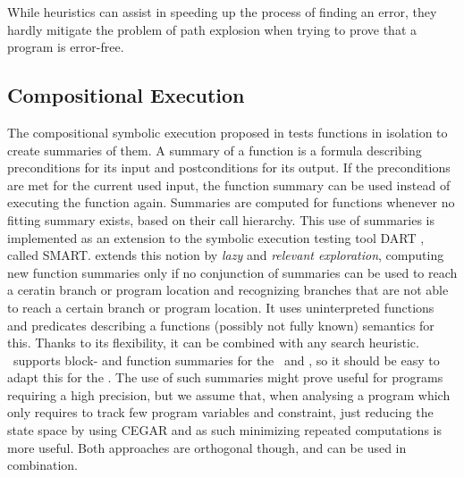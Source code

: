 While heuristics can assist in speeding up the process of finding an error, they hardly mitigate the problem of path explosion when trying to prove that a program is error-free.
\subsection*{Compositional Execution}
The compositional symbolic execution proposed in \cite{Godefroid2007} tests functions in isolation to create summaries of them.
A summary of a function is a formula describing preconditions for its input and postconditions for its output.
If the preconditions are met for the current used input, the function summary can be used instead of executing the function again.
Summaries are computed for functions whenever no fitting summary exists, based on their call hierarchy.
This use of summaries is implemented as an extension to the symbolic execution testing tool DART \cite{Godefroid2005}, called SMART.
\cite{Anand2008} extends this notion by \emph{lazy} and \emph{relevant exploration}, computing new function summaries only if no conjunction of summaries can be used to reach a ceratin branch or program location and
recognizing branches that are not able to reach a certain branch or program location.
It uses uninterpreted functions and predicates describing a functions (possibly not fully known) semantics for this.
Thanks to its flexibility, it can be combined with any search heuristic.
\CpaChecker\ supports block- and function summaries for the \predicateCPA\ and , so it should be easy to adapt this for the \symbolicExecutionCPA.
The use of such summaries might prove useful for programs requiring a high precision, but we assume that, when analysing a program which only requires to track few program variables and constraint, just reducing the state space by using CEGAR and as such minimizing repeated computations is more useful.
Both approaches are orthogonal though, and can be used in combination.

